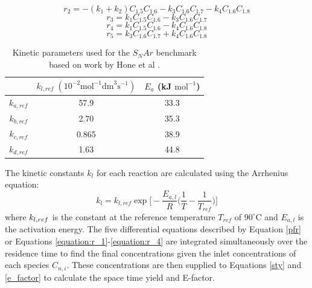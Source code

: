 \begin{equation}
	r_2 = -(k_1+k_2)C_{1.5}C_{1.6}-k_3C_{1.6}C_{1.7}-k_4C_{1.6}C_{1.8}
\end{equation}
\begin{equation}
	r_3 = k_1C_{1.5}C_{1.6}-k_3C_{1.6}C_{1.7}
\end{equation}
\begin{equation}
	r_4 = k_1C_{1.5}C_{1.6}-k_4C_{1.6}C_{1.8}
	\label{equation:r_4}
\end{equation}
\begin{equation}
	\label{last_snar_rxn_rate}
	r_5 = k_3C_{1.6}C_{1.7} + k_4C_{1.6}C_{1.8}
\end{equation}

\begin{table}[tb]
  \centering
  \caption{Kinetic parameters used for the $S_NAr$ benchmark based on work by Hone et al \cite{Hone2017}.}
  \begin{tabular}{ccc}
    &$k_{l,ref} \; (10^{-2} \text{mol}^{-1} \text{dm}^3 \text{s}^{-1})$ & $E_a$ (kJ $\text{mol}^{-1}$) \\
    \hline
    $k_{a,ref}$ & 57.9 & 33.3  \\
    $k_{b,ref}$ & 2.70 & 35.3  \\
    $k_{c,ref}$ & 0.865 & 38.9 \\
    $k_{d,ref}$ & 1.63 & 44.8 \\
  \end{tabular}
  
  \label{table:snar_parameters}
\end{table}

The kinetic constants $k_l$ for each reaction are calculated using the Arrhenius equation:
\begin{equation}
	k_l = k_{l, ref} \exp\Biggl[-\frac{E_{a,l}}{R}\biggl(\frac{1}{T}-\frac{1}{T_{ref}}\biggr)\Biggr]
\end{equation}
where $k_{l, \\ref}$ is the constant at the reference temperature $T_{ref}$ of $90^{\circ}$C and $E_{a,l}$ is the activation energy. The five differential equations described by Equation \ref{pfr} or Equations \ref{equation:r_1}-\ref{equation:r_4} are integrated simultaneously over the residence time to find the final concentrations given the inlet concentrations of each species $C_{n,i}$. These concentrations are then supplied to Equations \ref{sty} and \ref{e_factor} to calculate the space time yield and E-factor.


